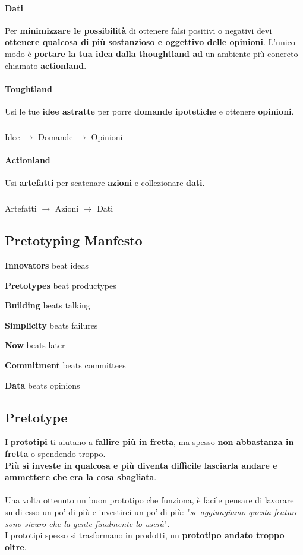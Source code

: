 \documentclass[10pt]{article}
\begin{document}
\paragraph{Dati} Per \textbf{minimizzare le possibilità} di ottenere falsi positivi o negativi devi \textbf{ottenere qualcosa di più sostanzioso e oggettivo delle opinioni}. L'unico modo è \textbf{portare la tua idea dalla thoughtland ad} un ambiente più concreto chiamato \textbf{actionland}.
\paragraph{Toughtland} Usi le tue \textbf{idee astratte} per porre \textbf{domande ipotetiche} e ottenere \textbf{opinioni}.
\subparagraph{} Idee $\longrightarrow$ Domande $\longrightarrow$ Opinioni
\paragraph{Actionland} Usi \textbf{artefatti} per scatenare \textbf{azioni} e collezionare \textbf{dati}.
\subparagraph{} Artefatti $\longrightarrow$ Azioni $\longrightarrow$ Dati
\subsection{Pretotyping Manfesto}
\begin{list}{}{}
\item \textbf{Innovators} beat ideas
\item \textbf{Pretotypes} beat productypes
\item \textbf{Building} beats talking
\item \textbf{Simplicity} beats failures
\item \textbf{Now} beats later
\item \textbf{Commitment} beats committees
\item \textbf{Data} beats opinions
\end{list}
\pagebreak
\subsection{Pretotype}
I \textbf{prototipi} ti aiutano a \textbf{fallire più in fretta}, ma spesso \textbf{non abbastanza in fretta} o spendendo troppo.\\
\textbf{Più si investe in qualcosa e più diventa difficile lasciarla andare e ammettere che era la cosa sbagliata}.\\\\
Una volta ottenuto un buon prototipo che funziona, è facile pensare di lavorare su di esso un po' di più e investirci un po' di più: "\textit{se aggiungiamo questa feature sono sicuro che la gente finalmente lo userà}".\\
I prototipi spesso si trasformano in prodotti, un \textbf{prototipo andato troppo oltre}.
\end{document}
